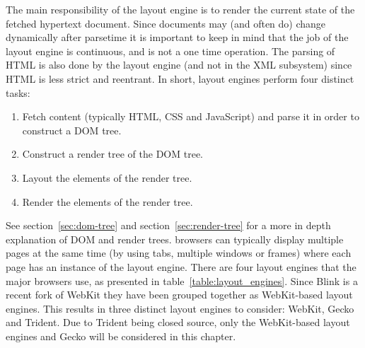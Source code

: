 \documentclass[a4paper,11pt]{kth-mag}
\begin{document}
      The main responsibility of the \gls{layout engine} is to render the current state of the fetched \gls{hypertext} \gls{document}.
      Since \glspl{document} may (and often do) change dynamically after parsetime it is important to keep in mind that the job of the \gls{layout engine} is continuous, and is not a one time operation.
      The parsing of \gls{HTML} is also done by the \gls{layout engine} (and not in the \gls{XML} subsystem) since \gls{HTML} is less strict and reentrant.
      In short, \glspl{layout engine} perform four distinct tasks:
      \begin{enumerate}
        \item Fetch content (typically \gls{HTML}, \gls{CSS} and \gls{JavaScript}) and parse it in order to construct a \gls{DOM} tree. 
        \item Construct a \gls{render tree} of the \gls{DOM} tree.
        \item Layout the \glspl{element} of the \gls{render tree}.
        \item Render the \glspl{element} of the \gls{render tree}.
      \end{enumerate}
      See section~\ref{sec:dom-tree} and section~\ref{sec:render-tree} for a more in depth explanation of \gls{DOM} and \glspl{render tree}.
      \Glspl{browser} can typically display multiple pages at the same time (by using tabs, multiple windows or frames) where each page has an instance of the \gls{layout engine}.
      There are four \glspl{layout engine} that the major \glspl{browser} use, as presented in table~\ref{table:layout_engines}.
      Since Blink is a recent \gls{fork} of \gls{WebKit} they have been grouped together as \gls{WebKit}-based \glspl{layout engine}.
      This results in three distinct \glspl{layout engine} to consider: \gls{WebKit}, Gecko and Trident.
      Due to Trident being closed source, only the \gls{WebKit}-based \glspl{layout engine} and Gecko will be considered in this chapter. 
\end{document}
